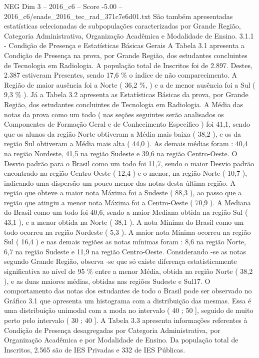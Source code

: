 \begin{textsample}{NEG Dim 3 – 2016\_c6 – Score -5.00 – 2016\_c6/enade\_2016\_tec\_rad\_371c7e6d01.txt}
São também apresentadas estatísticas selecionadas de subpopulações caracterizadas por Grande Região, Categoria Administrativa, Organização Acadêmica e Modalidade de Ensino. 3.1.1 - Condição de Presença e Estatísticas Básicas Gerais A Tabela 3.1 apresenta a Condição de Presença na prova, por Grande Região, dos estudantes concluintes de Tecnologia em Radiologia.
A população total de Inscritos foi de 2.897.
Destes, 2.387 estiveram Presentes, sendo 17,6 \% o índice de não comparecimento.
A Região de maior ausência foi a Norte ( 36,2 \%, ) e a de menor ausência foi a Sul ( 9,3 \% ).
Já a Tabela 3.2 apresenta as Estatísticas Básicas da prova, por Grande Região, dos estudantes concluintes de Tecnologia em Radiologia.
A Média das notas da prova como um todo ( nas seções seguintes serão analisados os Componentes de Formação Geral e de Conhecimento Específico ) foi 41,1, sendo que os alunos da região Norte obtiveram a Média mais baixa ( 38,2 ), e os da região Sul obtiveram a Média mais alta ( 44,0 ).
As demais médias foram : 40,4 na região Nordeste, 41,5 na região Sudeste e 39,6 na região Centro-Oeste.
O Desvio padrão para o Brasil como um todo foi 11,7, sendo o maior Desvio padrão encontrado na região Centro-Oeste ( 12,4 ) e o menor, na região Norte ( 10,7 ), indicando uma dispersão um pouco menor das notas desta última região.
A região que obteve a maior nota Máxima foi a Sudeste ( 88,3 ), ao passo que a região que atingiu a menor nota Máxima foi a Centro-Oeste ( 70,9 ).
A Mediana do Brasil como um todo foi 40,6, sendo a maior Mediana obtida na região Sul ( 43,1 ), e a menor obtida na Norte ( 38,1 ).
A nota Mínima do Brasil como um todo ocorreu na região Nordeste ( 5,3 ).
A maior nota Mínima ocorreu na região Sul ( 16,4 ) e nas demais regiões as notas mínimas foram : 8,6 na região Norte, 6,7 na região Sudeste e 11,9 na região Centro-Oeste.
Considerando -se as notas segundo Grande Região, observa -se que só existe diferença estatisticamente significativa ao nível de 95 \% entre a menor Média, obtida na região Norte ( 38,2 ), e as duas maiores médias, obtidas nas regiões Sudeste e Sul17.
O comportamento das notas dos estudantes de todo o Brasil pode ser observado no Gráfico 3.1 que apresenta um histograma com a distribuição das mesmas.
Essa é uma distribuição unimodal com a moda no intervalo ( 40 ; 50 ], seguido de muito perto pelo intervalo ( 30 ; 40 ].
A Tabela 3.3 apresenta informações referentes à Condição de Presença desagregadas por Categoria Administrativa, por Organização Acadêmica e por Modalidade de Ensino.
Da população total de Inscritos, 2.565 são de IES Privadas e 332 de IES Públicas.

\end{textsample}

